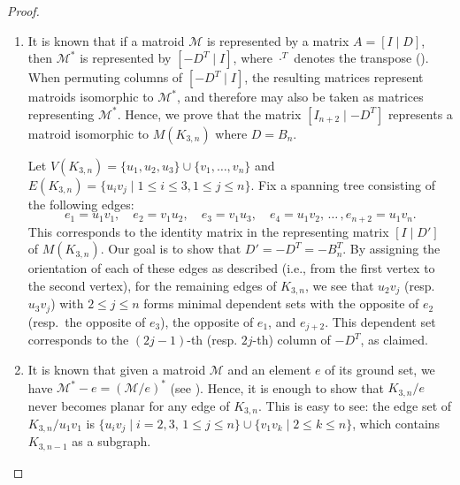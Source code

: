 \documentclass{amsart}
\numberwithin{equation}{section}
\theoremstyle{plain}
\newtheorem{thm}{Theorem}[section]
\theoremstyle{definition}
\newcommand{\calM}{\mathcal{M}}
\begin{document}
\begin{proof}
    \hfill
    \begin{enumerate}[label=(\roman*)]
        \item  It is known that if a matroid $\calM$ is represented by a matrix $A = [I \mid D]$, then $\calM^*$ is represented by $[-D^T \mid I]$, where $\cdot^T$ denotes the transpose (\cite[Theorem 2.2.8]{Oxley}). 
        When permuting columns of $[-D^T \mid I]$, the resulting matrices represent matroids isomorphic to $\calM^*$, and therefore may also be taken as matrices representing $\calM^*$. 
        Hence, we prove that the matrix $[I_{n+2} \mid -D^T]$ represents a matroid isomorphic to $M(K_{3,n})$ where $D= B_n$.
        
        Let $V(K_{3,n})=\{u_1,u_2,u_3\} \cup \{v_1,\ldots,v_n\}$ and $E(K_{3,n})=\{u_iv_j \mid 1 \leq i \leq 3, 1 \leq j \leq n\}$. 
    Fix a spanning tree consisting of the following edges: 
    \[
        e_1=u_1v_1, \quad e_2=v_1u_2,\quad e_3=v_1u_3,\quad e_4=u_1v_2,\,\ldots\,,e_{n+2}=u_1v_n.
    \]
    This corresponds to the identity matrix in the representing matrix $[I \mid D']$ of $M(K_{3,n})$. 
    Our goal is to show that $D'=-D^T =-B_n^T$. 
    By assigning the orientation of each of these edges as described (i.e., from the first vertex to the second vertex), 
    for the remaining edges of $K_{3,n}$, we see that $u_2v_j$ (resp. $u_3v_j$) with $2 \leq j \leq n$ forms minimal dependent sets with the opposite of $e_2$ (resp.~the opposite of $e_3$), the opposite of $e_1$, and $e_{j+2}$. 
    This dependent set corresponds to the $(2j-1)$-th (resp. $2j$-th) column of $-D^T$, as claimed.
    
    \item It is known that given a matroid $\calM$ and an element $e$ of its ground set, we have $\calM^*- e = (\calM/e)^*$ (see \cite[3.1.1]{Oxley}). 
    Hence, it is enough to show that $K_{3,n}/e$ never becomes planar for any edge of $K_{3,n}$.
    This is easy to see: the edge set of $K_{3,n}/u_1v_1$ is $\{u_iv_j \mid i=2,3, \, 1 \leq j \leq n\} \cup \{v_1v_k \mid 2 \leq k \leq n\}$, which contains $K_{3,n-1}$ as a subgraph. \qedhere
    \end{enumerate}
\end{proof}


\end{document}
